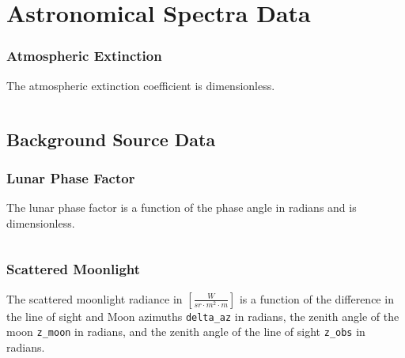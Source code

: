 \section{Astronomical Spectra Data} \label{data:spectra}

\subsubsection{Atmospheric Extinction} \label{data:atm}
The atmospheric extinction coefficient is dimensionless.
\begin{listing}[H]
\inputminted[breaklines=true, breakanywhere=true, breaksymbol=\hspace{0pt}, fontsize=\footnotesize]{json}{/Users/liamrobinson/Documents/PyLightCurves/mirage/resources/data/atmos_extinction.json}
\end{listing}


\subsection{Background Source Data}

\subsubsection{Lunar Phase Factor}
The lunar phase factor is a function of the phase angle in radians and is dimensionless.
\begin{listing}[H]
\inputminted[breaklines=true, breakanywhere=true, breaksymbol=\hspace{0pt}, fontsize=\footnotesize]{json}{/Users/liamrobinson/Documents/PyLightCurves/mirage/resources/data/lunar_phase.json}
\end{listing}

\subsubsection{Scattered Moonlight}
The scattered moonlight radiance in $\left[ \frac{W}{sr \cdot m^2 \cdot m} \right]$ is a function of the difference in the line of sight and Moon azimuths \texttt{delta\_az} in radians, the zenith angle of the moon \texttt{z\_moon} in radians, and the zenith angle of the line of sight \texttt{z\_obs} in radians.

